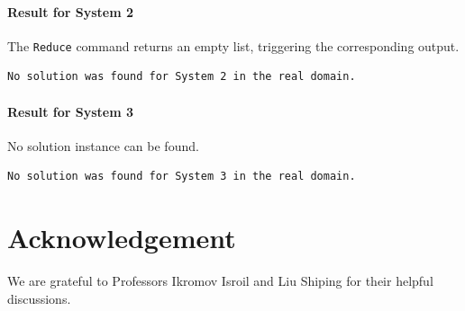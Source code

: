\documentclass[12pt]{amsart}
\begin{document}
\paragraph{Result for System 2}
The \texttt{Reduce} command returns an empty list, triggering the corresponding output.
\begin{verbatim}
No solution was found for System 2 in the real domain.
\end{verbatim}


\paragraph{Result for System 3}
No solution instance can be found.
\begin{verbatim}
No solution was found for System 3 in the real domain.
\end{verbatim}

\section*{Acknowledgement}
  We are grateful to Professors Ikromov Isroil and Liu Shiping for their helpful discussions.
	
	
	
	
	
	
	
	
	
	
\end{document}
